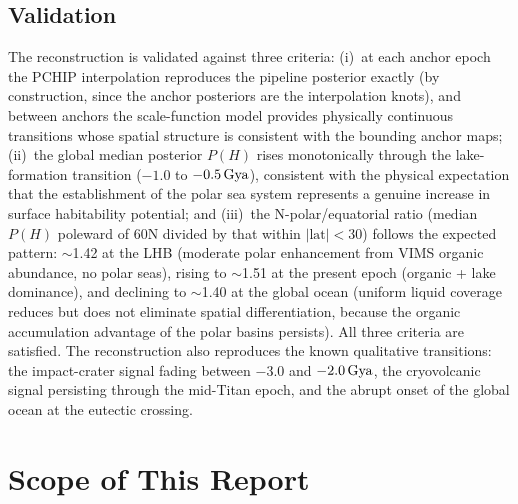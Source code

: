 \subsection{Validation}
\label{sec:validation}

The reconstruction is validated against three criteria: (i)~at each anchor epoch the PCHIP interpolation reproduces the pipeline posterior exactly (by construction, since the anchor posteriors are the interpolation knots), and between anchors the scale-function model provides physically continuous transitions whose spatial structure is consistent with the bounding anchor maps; (ii)~the global median posterior $P(H)$ rises monotonically through the lake-formation transition ($-1.0$ to $-0.5\,\text{Gya}$), consistent with the physical expectation that the establishment of the polar sea system represents a genuine increase in surface habitability potential; and (iii)~the N-polar/equatorial ratio (median $P(H)$ poleward of 60\textdegree{}N divided by that within $|\text{lat}| < 30$\textdegree{}) follows the expected pattern: $\sim$1.42 at the LHB (moderate polar enhancement from VIMS organic abundance, no polar seas), rising to $\sim$1.51 at the present epoch (organic + lake dominance), and declining to $\sim$1.40 at the global ocean (uniform liquid coverage reduces but does not eliminate spatial differentiation, because the organic accumulation advantage of the polar basins persists).  All three criteria are satisfied.  The reconstruction also reproduces the known qualitative transitions: the impact-crater signal fading between $-3.0$ and $-2.0\,\text{Gya}$, the cryovolcanic signal persisting through the mid-Titan epoch, and the abrupt onset of the global ocean at the eutectic crossing.

\section{Scope of This Report}
\label{sec:scope_thesis}

